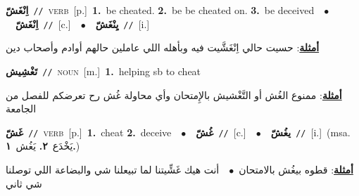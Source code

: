 \documentclass[10pt,a4paper,twoside]{article} %
\begin{document}
\begin{multicols}{2}
{\setlength\topsep{0pt}\textbf{\foreignlanguage{arabic}{اِنْغَشّ}}\ {\color{gray}\texttt{//}\color{black}}\ \textsc{verb}\ [p.]\ \textbf{1.}~be cheated.  \textbf{2.}~be be cheated on.  \textbf{3.}~be deceived\ \ $\bullet$\ \ \setlength\topsep{0pt}\textbf{\foreignlanguage{arabic}{اِنْغَشّ}}\ {\color{gray}\texttt{//}\color{black}}\ [c.]\ \ $\bullet$\ \ \setlength\topsep{0pt}\textbf{\foreignlanguage{arabic}{يِنْغَشّ}}\ {\color{gray}\texttt{//}\color{black}}\ [i.]\  \begin{flushright}\color{gray}\foreignlanguage{arabic}{\textbf{\underline{\foreignlanguage{arabic}{أمثلة}}}: حسيت حالي اِنْغَشَّيت فيه وبأهله اللي عاملين حالهم أوادم وأصحاب دين}\end{flushright}\color{black}} \vspace{2mm}

{\setlength\topsep{0pt}\textbf{\foreignlanguage{arabic}{تَغْشِيش}}\ {\color{gray}\texttt{//}\color{black}}\ \textsc{noun}\ [m.]\ \textbf{1.}~helping sb to cheat\  \begin{flushright}\color{gray}\foreignlanguage{arabic}{\textbf{\underline{\foreignlanguage{arabic}{أمثلة}}}: ممنوع الغُش أو التَّغْشيش بالإِمتحان وأي محاولة غُش رح تعرضكم للفصل من الجامعة}\end{flushright}\color{black}} \vspace{2mm}

{\setlength\topsep{0pt}\textbf{\foreignlanguage{arabic}{غَشّ}}\ {\color{gray}\texttt{//}\color{black}}\ \textsc{verb}\ [p.]\ \textbf{1.}~cheat  \textbf{2.}~deceive\ \ $\bullet$\ \ \setlength\topsep{0pt}\textbf{\foreignlanguage{arabic}{غُشّ}}\ {\color{gray}\texttt{//}\color{black}}\ [c.]\ \ $\bullet$\ \ \setlength\topsep{0pt}\textbf{\foreignlanguage{arabic}{يغُشّ}}\ {\color{gray}\texttt{//}\color{black}}\ [i.]\ \color{gray}(msa. \foreignlanguage{arabic}{يَخْدَع}~\foreignlanguage{arabic}{\textbf{٢.}}  \foreignlanguage{arabic}{يَغُش}~\foreignlanguage{arabic}{\textbf{١.}})\color{black}\  \begin{flushright}\color{gray}\foreignlanguage{arabic}{\textbf{\underline{\foreignlanguage{arabic}{أمثلة}}}: قطوه بيغُش بالامتحان\ $\bullet$\ \  أنت هيك غَشِّيتنا لما تبيعلنا شي والبضاعة اللي توصلنا شي ثاني}\end{flushright}\color{black}} \vspace{2mm}


\end{multicols}
\end{document}

